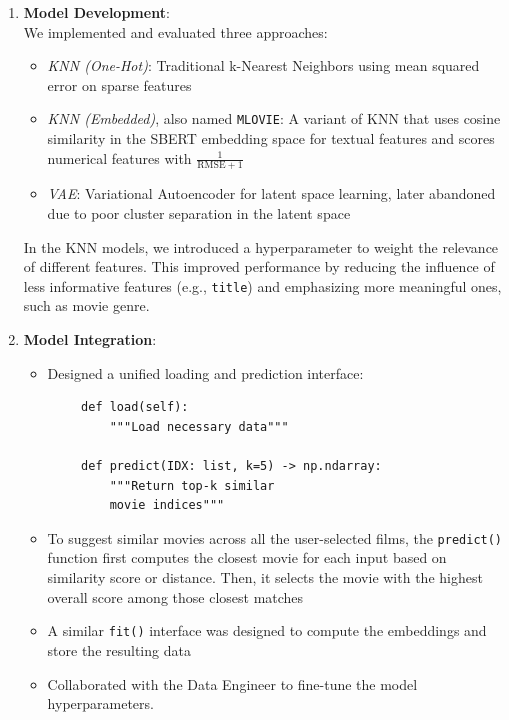 \documentclass{article}
\begin{document}
\begin{enumerate}
    \item \textbf{Model Development}: \\
        We implemented and evaluated three approaches:
        \begin{itemize}
            \item \textit{KNN (One-Hot)}: Traditional k-Nearest Neighbors using mean squared error on sparse features
            \item \textit{KNN (Embedded)}, also named \verb|MLOVIE|: 
            A variant of KNN that uses cosine similarity in the SBERT embedding space for textual features and scores numerical features with $\frac{1}{\text{RMSE} + 1}$
            \item \textit{VAE}: Variational Autoencoder for latent space learning, later abandoned due to poor cluster separation in the latent space
        \end{itemize}

        In the KNN models, we introduced a hyperparameter to weight the relevance of different features. This improved performance by reducing the influence of less informative features (e.g., \verb|title|) and emphasizing more meaningful ones, such as movie genre.

    
    \item \textbf{Model Integration}: \\
        \begin{itemize}
            \item Designed a unified loading and prediction interface:
        \end{itemize}

        \begin{verbatim}
        def load(self):
            """Load necessary data"""

        def predict(IDX: list, k=5) -> np.ndarray:
            """Return top-k similar
            movie indices"""
        \end{verbatim}

        \begin{itemize}
            \item To suggest similar movies across all the user-selected films, the \verb|predict()| function first computes the closest movie for each input based on similarity score or distance. Then, it selects the movie with the highest overall score among those closest matches
            
            \item A similar \verb|fit()| interface was designed to compute the embeddings and store the resulting data

            \item Collaborated with the Data Engineer to fine-tune the model hyperparameters.
        \end{itemize}
     
\end{enumerate}
\end{document}
